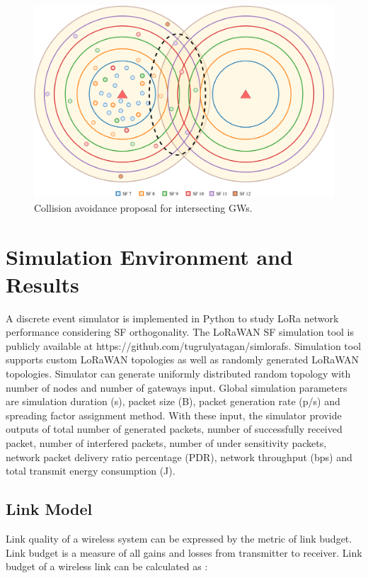 \documentclass[conference]{IEEEtran}
\begin{document}
\begin{figure}
\centering
\includegraphics[width=\linewidth]{collision_solution_multi_gw}
\caption{Collision avoidance proposal for intersecting GWs.}
\label{fig:collision_solution_multi_gw}
\end{figure}


\section{Simulation Environment and Results} \label{Simulation Environment and Results}
\par A discrete event simulator is implemented in Python to study LoRa network performance considering SF orthogonality. The LoRaWAN SF simulation tool is publicly available at https://github.com/tugrulyatagan/simlorafs. Simulation tool supports custom LoRaWAN topologies as well as randomly generated LoRaWAN topologies. Simulator can generate uniformly distributed random topology with number of nodes and number of gateways input. Global simulation parameters are simulation duration (s), packet size (B), packet generation rate (p/s) and spreading factor assignment method. With these input, the simulator provide outputs of total number of generated packets, number of successfully received packet, number of interfered packets, number of under sensitivity packets, network packet delivery ratio percentage (PDR), network throughput (bps) and total transmit energy consumption (J).

\subsection{Link Model}
\par Link quality of a wireless system can be expressed by the metric of link budget. Link budget is a measure of all gains and losses from transmitter to receiver. Link budget of a wireless link can be calculated as \cite{AN1200.22}:
\end{document}
